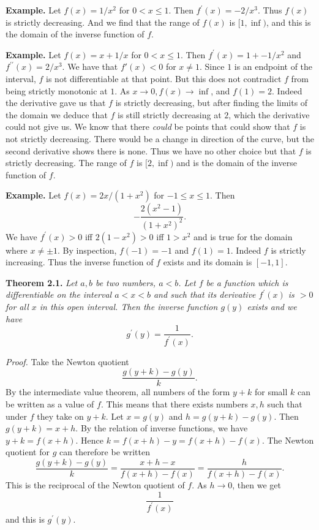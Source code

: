   \textbf{Example.} Let $f(x) = 1/x^2$ for $0 < x \le 1$. Then $f^\prime(x) = -2/x^3$. Thus $f(x)$ is strictly decreasing. And we find that the range of $f(x)$ is $[1, \inf)$, and this is the domain of the inverse function of $f$.
    
    \textbf{Example.} Let $f(x) = x + 1/x$ for $0 < x \le 1$. Then $f^\prime(x) = 1 + -1/x^2$ and $f^{\prime\prime}(x) = 2/x^3$. We have that $f'(x) < 0$ for $x \ne 1$. Since $1$ is an endpoint of the interval, $f$ is not differentiable at that point. But this does not contradict $f$ from being strictly monotonic at $1$. As $x \to 0, f(x) \to \inf$, and $f(1) = 2$. Indeed the derivative gave us that $f$ is strictly decreasing, but after finding the limits of the domain we deduce that $f$ is still strictly decreasing at $2$, which the derivative could not give us. We know that there \textit{could} be points that could show that $f$ is not strictly decreasing. There would be a change in direction of the curve, but the second derivative shows there is none. Thus we have no other choice but that $f$ is strictly decreasing. The range of $f$ is $[2, \inf)$ and is the domain of the inverse function of $f$.

      \textbf{Example.} Let $f(x) = 2x/(1 + x^2)$ for $-1 \le x \le 1$. Then
      \[-\frac{2(x^2 - 1)}{(1 + x^2)^2}.\]
      We have $f^\prime(x) > 0$ iff $2(1 - x^2) > 0$ iff $1 > x^2$ and is true for the domain where $x \ne \pm 1$. By inspection, $f(-1) = -1$ and $f(1) = 1$. Indeed $f$ is strictly increasing. Thus the inverse function of $f$ exists and its domain is $[-1, 1]$.
      
      \textbf{Theorem 2.1.} \textit{Let $a, b$ be two numbers, $a < b$. Let $f$ be a function which is differentiable on the interval $a < x < b$ and such that its derivative $f^\prime(x)$ is $> 0$ for all $x$ in this open interval. Then the inverse function $g(y)$ exists and we have}
      \[g^\prime(y) = \frac{1}{f^\prime(x)}.\]

      \textit{Proof.} Take the Newton quotient
      \[\frac{g(y + k) - g(y)}{k}.\]
      By the intermediate value theorem, all numbers of the form $y + k$ for small $k$ can be written as a value of $f$. This means that there exists numbers $x, h$ such that under $f$ they take on $y + k$. Let $x = g(y)$ and $h = g(y + k) - g(y)$. Then $g(y + k) = x + h$. By the relation of inverse functions, we have $y + k = f(x + h)$. Hence $k = f(x + h) - y = f(x + h) - f(x)$. The Newton quotient for $g$ can therefore be written
      \[\frac{g(y + k) - g(y)}{k} = \frac{x + h - x}{f(x + h) - f(x)} = \frac{h}{f(x + h) - f(x)}.\]
      This is the reciprocal of the Newton quotient of $f$. As $h \to 0$, then we get
      \[\frac{1}{f^\prime(x)}\]
      and this is $g^\prime(y)$.

